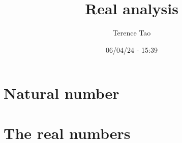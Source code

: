 \documentclass[11pt]{elegantbook}
\title{Real analysis}
\subtitle{Terence Tao}
\date{06/04/24 - 15:39}
\begin{document}
\maketitle

\frontmatter
\tableofcontents

\mainmatter

\chapter{Natural number}


\chapter{The real numbers}


\end{document}
